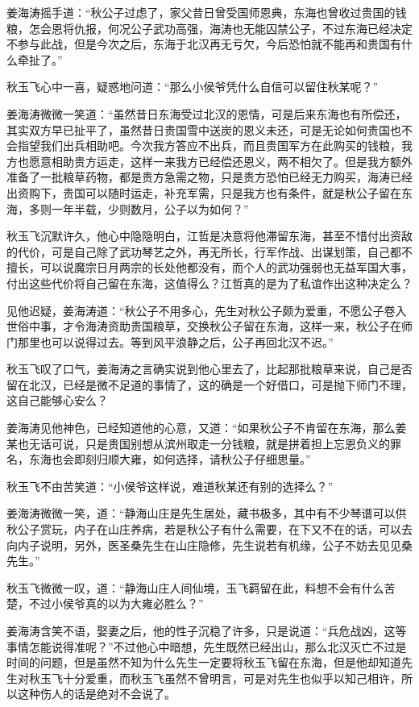 姜海涛摇手道：“秋公子过虑了，家父昔日曾受国师恩典，东海也曾收过贵国的钱粮，怎会恩将仇报，何况公子武功高强，海涛也无能囚禁公子，不过东海已经决定不参与此战，但是今次之后，东海于北汉再无亏欠，今后恐怕就不能再和贵国有什么牵扯了。”

秋玉飞心中一喜，疑惑地问道：“那么小侯爷凭什么自信可以留住秋某呢？”

姜海涛微微一笑道：“虽然昔日东海受过北汉的恩情，可是后来东海也有所偿还，其实双方早已扯平了，虽然昔日贵国雪中送炭的恩义未还，可是无论如何贵国也不会指望我们出兵相助吧。今次我方答应不出兵，而且贵国军方在此购买的钱粮，我方也愿意相助贵方运走，这样一来我方已经偿还恩义，两不相欠了。但是我方额外准备了一批粮草药物，都是贵方急需之物，只是贵方恐怕已经无力购买，海涛已经出资购下，贵国可以随时运走，补充军需，只是我方也有条件，就是秋公子留在东海，多则一年半载，少则数月，公子以为如何？”

秋玉飞沉默许久，他心中隐隐明白，江哲是决意将他滞留东海，甚至不惜付出资敌的代价，可是自己除了武功琴艺之外，再无所长，行军作战、出谋划策，自己都不擅长，可以说魔宗日月两宗的长处他都没有，而个人的武功强弱也无益军国大事，付出这些代价将自己留在东海，这值得么？江哲真的是为了私谊作出这种决定么？

见他迟疑，姜海涛道：“秋公子不用多心，先生对秋公子颇为爱重，不愿公子卷入世俗中事，才令海涛资助贵国粮草，交换秋公子留在东海，这样一来，秋公子在师门那里也可以说得过去。等到风平浪静之后，公子再回北汉不迟。”

秋玉飞叹了口气，姜海涛之言确实说到他心里去了，比起那批粮草来说，自己是否留在北汉，已经是微不足道的事情了，这的确是一个好借口，可是抛下师门不理，这自己能够心安么？

姜海涛见他神色，已经知道他的心意，又道：“如果秋公子不肯留在东海，那么姜某也无话可说，只是贵国别想从滨州取走一分钱粮，就是拼着担上忘恩负义的罪名，东海也会即刻归顺大雍，如何选择，请秋公子仔细思量。”

秋玉飞不由苦笑道：“小侯爷这样说，难道秋某还有别的选择么？”

姜海涛微微一笑，道：“静海山庄是先生居处，藏书极多，其中有不少琴谱可以供秋公子赏玩，内子在山庄养病，若是秋公子有什么需要，在下又不在的话，可以去向内子说明，另外，医圣桑先生在山庄隐修，先生说若有机缘，公子不妨去见见桑先生。”

秋玉飞微微一叹，道：“静海山庄人间仙境，玉飞羁留在此，料想不会有什么苦楚，不过小侯爷真的以为大雍必胜么？”

姜海涛含笑不语，娶妻之后，他的性子沉稳了许多，只是说道：“兵危战凶，这等事情怎能说得准呢？”不过他心中暗想，先生既然已经出山，那么北汉灭亡不过是时间的问题，但是虽然不知为什么先生一定要将秋玉飞留在东海，但是他却知道先生对秋玉飞十分爱重，而秋玉飞虽然不曾明言，可是对先生也似乎以知己相许，所以这种伤人的话是绝对不会说了。

